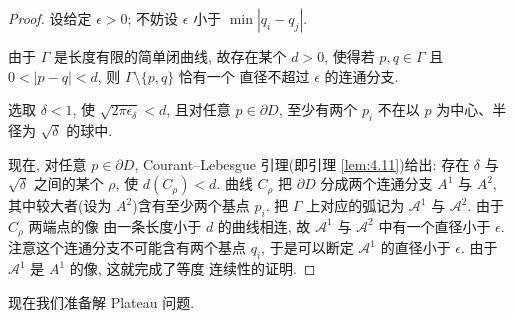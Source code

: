 \begin{proof}
设给定 $\epsilon>0$; 不妨设 $\epsilon$ 小于 $\min|q_i-q_j|$.

由于 $\Gamma$ 是长度有限的简单闭曲线, 故存在某个 $d>0$, 使得若
$p,q\in\Gamma$ 且 $0<|p-q|<d$, 则 $\Gamma\setminus\{p,q\}$ 恰有一个
直径不超过 $\epsilon$ 的连通分支.

选取 $\delta<1$, 使 $\sqrt{2\pi\epsilon_\delta}<d$, 且对任意
$p\in\partial D$, 至少有两个 $p_i$ 不在以 $p$ 为中心、半径为
$\sqrt{\delta}$ 的球中.

现在, 对任意 $p\in\partial D$, Courant--Lebesgue 引理(即引理
\ref{lem:4.11})给出: 存在 $\delta$ 与 $\sqrt{\delta}$ 之间的某个 $\rho$,
使 $d(C_\rho)<d$. 曲线 $C_\rho$ 把 $\partial D$ 分成两个连通分支
$A^1$ 与 $A^2$, 其中较大者(设为 $A^2$)含有至少两个基点 $p_i$. 把
$\Gamma$ 上对应的弧记为 $\mathcal{A}^1$ 与 $\mathcal{A}^2$. 由于 $C_\rho$ 两端点的像
由一条长度小于 $d$ 的曲线相连, 故 $\mathcal{A}^1$ 与 $\mathcal{A}^2$ 中有一个直径小于
$\epsilon$. 注意这个连通分支不可能含有两个基点 $q_i$, 于是可以断定
$\mathcal{A}^1$ 的直径小于 $\epsilon$. 由于 $\mathcal{A}^1$ 是 $A^1$ 的像, 这就完成了等度
连续性的证明.
\end{proof}

现在我们准备解 Plateau 问题.

